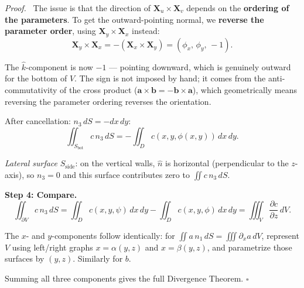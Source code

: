 \documentclass[11pt]{report}
\renewenvironment{proof}[1][Proof]{\par\noindent\textit{#1.}\ }{\hfill$\square$\par\medskip}
\newcommand{\parti}[2]{\frac{\partial #1}{\partial #2}}
\begin{document}
\begin{proof}
The issue is that the direction of $\mathbf{X}_u \times \mathbf{X}_v$ depends on the \textbf{ordering of the parameters}. To get the outward-pointing normal, we \textbf{reverse the parameter order}, using $\mathbf{X}_y \times \mathbf{X}_x$ instead:
\[
\mathbf{X}_y \times \mathbf{X}_x = -(\mathbf{X}_x \times \mathbf{X}_y) = (\phi_x, \, \phi_y, \, -1).
\]

The $\hat{k}$-component is now $-1$ --- pointing downward, which is genuinely outward for the bottom of $V$. The sign is not imposed by hand; it comes from the anti-commutativity of the cross product ($\mathbf{a} \times \mathbf{b} = -\mathbf{b} \times \mathbf{a}$), which geometrically means reversing the parameter ordering reverses the orientation.

After cancellation: $n_3 \, dS = -dx \, dy$:
\[
\iint_{S_{\text{bot}}} c \, n_3 \, dS = -\iint_D c(x, y, \phi(x,y)) \, dx \, dy.
\]

\textit{Lateral surface} $S_{\text{side}}$: on the vertical walls, $\hat{n}$ is horizontal (perpendicular to the $z$-axis), so $n_3 = 0$ and this surface contributes zero to $\iint c \, n_3 \, dS$.

\textbf{Step 4: Compare.}
\[
\iint_{\partial V} c \, n_3 \, dS = \iint_D c(x,y,\psi) \, dx \, dy - \iint_D c(x,y,\phi) \, dx \, dy = \iiint_V \parti{c}{z} \, dV.
\]

The $x$- and $y$-components follow identically: for $\iint a \, n_1 \, dS = \iiint \partial_x a \, dV$, represent $V$ using left/right graphs $x = \alpha(y,z)$ and $x = \beta(y,z)$, and parametrize those surfaces by $(y,z)$. Similarly for $b$.

Summing all three components gives the full Divergence Theorem.
\end{proof}
\end{document}
